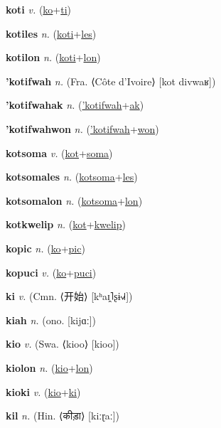 \textbf{\hypertarget{koti}{koti}} \textit{v.} (\hyperlink{ko}{ko}+\allowbreak \hyperlink{ti}{ti})


\textbf{\hypertarget{kotiles}{kotiles}} \textit{n.} (\hyperlink{koti}{koti}+\allowbreak \hyperlink{les}{les})


\textbf{\hypertarget{kotilon}{kotilon}} \textit{n.} (\hyperlink{koti}{koti}+\allowbreak \hyperlink{lon}{lon})


\textbf{\hypertarget{'kotifwah}{'kotifwah}} \textit{n.} (Fra. ⟨Côte d’Ivoire⟩ [kot divwaʁ])


\textbf{\hypertarget{'kotifwahak}{'kotifwahak}} \textit{n.} (\hyperlink{'kotifwah}{'kotifwah}+\allowbreak \hyperlink{ak}{ak})


\textbf{\hypertarget{'kotifwahwon}{'kotifwahwon}} \textit{n.} (\hyperlink{'kotifwah}{'kotifwah}+\allowbreak \hyperlink{won}{won})


\textbf{\hypertarget{kotsoma}{kotsoma}} \textit{v.} (\hyperlink{kot}{kot}+\allowbreak \hyperlink{soma}{soma})


\textbf{\hypertarget{kotsomales}{kotsomales}} \textit{n.} (\hyperlink{kotsoma}{kotsoma}+\allowbreak \hyperlink{les}{les})


\textbf{\hypertarget{kotsomalon}{kotsomalon}} \textit{n.} (\hyperlink{kotsoma}{kotsoma}+\allowbreak \hyperlink{lon}{lon})


\textbf{\hypertarget{kotkwelip}{kotkwelip}} \textit{n.} (\hyperlink{kot}{kot}+\allowbreak \hyperlink{kwelip}{kwelip})


\textbf{\hypertarget{kopic}{kopic}} \textit{n.} (\hyperlink{ko}{ko}+\allowbreak \hyperlink{pic}{pic})


\textbf{\hypertarget{kopuci}{kopuci}} \textit{v.} (\hyperlink{ko}{ko}+\allowbreak \hyperlink{puci}{puci})


\textbf{\hypertarget{ki}{ki}} \textit{v.} (Cmn. ⟨{\chinese{}开始}⟩ [kʰaɪ̯˥ʂɨ˧˩˧])


\textbf{\hypertarget{kiah}{kiah}} \textit{n.} (ono. [kijɑː])


\textbf{\hypertarget{kio}{kio}} \textit{v.} (Swa. ⟨kioo⟩ [kioo])


\textbf{\hypertarget{kiolon}{kiolon}} \textit{n.} (\hyperlink{kio}{kio}+\allowbreak \hyperlink{lon}{lon})


\textbf{\hypertarget{kioki}{kioki}} \textit{v.} (\hyperlink{kio}{kio}+\allowbreak \hyperlink{ki}{ki})


\textbf{\hypertarget{kil}{kil}} \textit{n.} (Hin. ⟨{\devanagari{}कीड़ा}⟩ [kiːɽaː])



